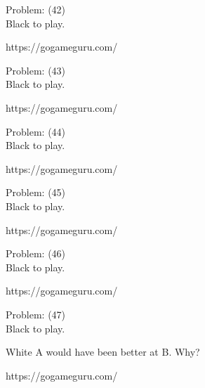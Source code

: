 \documentclass[11pt]{article}
\begin{document}
\begin{minipage}[t]{0.5\textwidth}
  {\centering
  
  Problem: (42)\\
  Black to play.

https://gogameguru.com/\\
  }
\end{minipage}
\begin{minipage}[t]{0.5\textwidth}
  {\centering
  
  Problem: (43)\\
  Black to play.

https://gogameguru.com/\\
  }
\end{minipage}
\begin{minipage}[t]{0.5\textwidth}
  {\centering
  
  Problem: (44)\\
  Black to play.

https://gogameguru.com/\\
  }
\end{minipage}
\begin{minipage}[t]{0.5\textwidth}
  {\centering
  
  Problem: (45)\\
  Black to play.

https://gogameguru.com/\\
  }
\end{minipage}
\begin{minipage}[t]{0.5\textwidth}
  {\centering
  
  Problem: (46)\\
  Black to play.

https://gogameguru.com/\\
  }
\end{minipage}
\begin{minipage}[t]{0.5\textwidth}
  {\centering
  
  Problem: (47)\\
  Black to play.

White A would have been better at B. Why?

https://gogameguru.com/\\
  }
\end{minipage}
\end{document}
